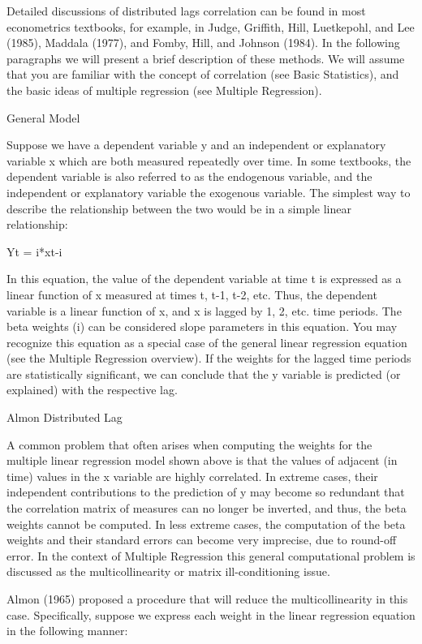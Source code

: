 Detailed discussions of distributed lags correlation can be found in most econometrics textbooks, for example, in Judge, Griffith, Hill, Luetkepohl, and Lee (1985), Maddala (1977), and Fomby, Hill, and Johnson (1984). In the following paragraphs we will present a brief description of these methods. We will assume that you are familiar with the concept of correlation (see Basic Statistics), and the basic ideas of multiple regression (see Multiple Regression).

General Model

Suppose we have a dependent variable y and an independent or explanatory variable x which are both measured repeatedly over time. In some textbooks, the dependent variable is also referred to as the endogenous variable, and the independent or explanatory variable the exogenous variable. The simplest way to describe the relationship between the two would be in a simple linear relationship:

Yt =  i*xt-i

In this equation, the value of the dependent variable at time t is expressed as a linear function of x measured at times t, t-1, t-2, etc. Thus, the dependent variable is a linear function of x, and x is lagged by 1, 2, etc. time periods. The beta weights (i) can be considered slope parameters in this equation. You may recognize this equation as a special case of the general linear regression equation (see the Multiple Regression overview). If the weights for the lagged time periods are statistically significant, we can conclude that the y variable is predicted (or explained) with the respective lag.

Almon Distributed Lag

A common problem that often arises when computing the weights for the multiple linear regression model shown above is that the values of adjacent (in time) values in the x variable are highly correlated. In extreme cases, their independent contributions to the prediction of y may become so redundant that the correlation matrix of measures can no longer be inverted, and thus, the beta weights cannot be computed. In less extreme cases, the computation of the beta weights and their standard errors can become very imprecise, due to round-off error. In the context of Multiple Regression this general computational problem is discussed as the multicollinearity or matrix ill-conditioning issue.

Almon (1965) proposed a procedure that will reduce the multicollinearity in this case. Specifically, suppose we express each weight in the linear regression equation in the following manner:

